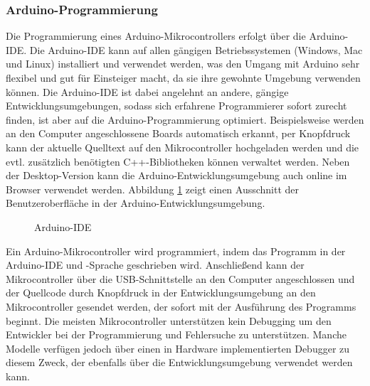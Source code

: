 \subsubsection{Arduino-Programmierung}
Die Programmierung eines Arduino-Mikrocontrollers erfolgt über die Arduino-IDE. Die Arduino-IDE kann auf allen gängigen Betriebssystemen (Windows, Mac und Linux) installiert und verwendet werden, was den Umgang mit Arduino sehr flexibel und gut für Einsteiger macht, da sie ihre gewohnte Umgebung verwenden können. Die Arduino-IDE ist dabei angelehnt an andere, gängige Entwicklungsumgebungen, sodass sich erfahrene Programmierer sofort zurecht finden, ist aber auf die Arduino-Programmierung optimiert. Beispielsweise werden an den Computer angeschlossene Boards automatisch erkannt, per Knopfdruck kann der aktuelle Quelltext auf den Mikrocontroller hochgeladen werden und die evtl. zusätzlich benötigten C++-Bibliotheken können verwaltet werden. Neben der Desktop-Version kann die Arduino-Entwicklungsumgebung auch online im Browser verwendet werden. Abbildung \ref{img:arduino_ide} zeigt einen Ausschnitt der Benutzeroberfläche in der Arduino-Entwicklungsumgebung.
\begin{figure}[H]
    \centering
    \caption{Arduino-IDE}
    \label{img:arduino_ide}
\end{figure}
\noindent
Ein Arduino-Mikrocontroller wird programmiert, indem das Programm in der Arduino-IDE und -Sprache geschrieben wird. Anschließend kann der Mikrocontroller über die USB-Schnittstelle an den Computer angeschlossen und der Quellcode durch Knopfdruck in der Entwicklungsumgebung an den Mikrocontroller gesendet werden, der sofort mit der Ausführung des Programms beginnt. Die meisten Mikrocontroller unterstützen kein Debugging um den Entwickler bei der Programmierung und Fehlersuche zu unterstützen. Manche Modelle verfügen jedoch über einen in Hardware implementierten Debugger zu diesem Zweck, der ebenfalls über die Entwicklungsumgebung verwendet werden kann.\\\\
